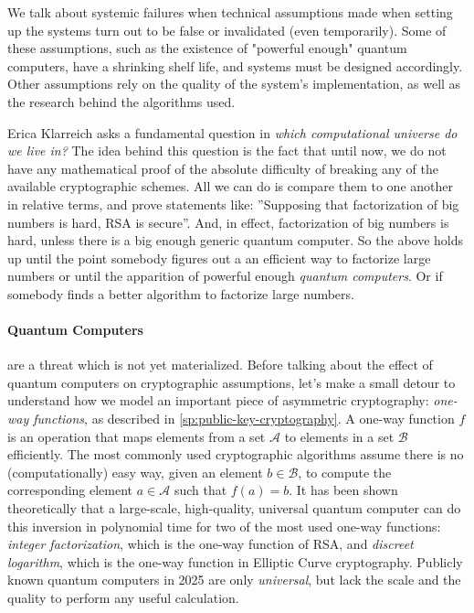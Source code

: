 We talk about systemic failures when technical assumptions made when setting up the systems turn out to be false or invalidated (even temporarily).
Some of these assumptions, such as the existence of "powerful enough" quantum computers, have a shrinking shelf life, and systems must be designed accordingly.
Other assumptions rely on the quality of the system's implementation, as well as
the research behind the algorithms used.

Erica Klarreich asks a fundamental question in \emph{which computational universe do we live in?}\cite{KlarUniverse22}
The idea behind this question is the fact that until now, we do not have any mathematical proof of the absolute difficulty
of breaking any of the available cryptographic schemes.
All we can do is compare them to one another in relative terms, and prove statements like: 
''Supposing that factorization of big numbers is hard, RSA is secure''.
And, in effect, factorization of big numbers is hard, unless there is a big enough generic quantum computer.
So the above holds up until the point somebody figures out a an efficient way to factorize large numbers or until the apparition of powerful enough \emph{quantum computers}.
Or if somebody finds a better algorithm to factorize large numbers. 

\paragraph{Quantum Computers} are a threat which is not yet materialized.
Before talking about the effect of quantum computers on cryptographic assumptions, let's make a small detour to understand how we model an important piece of asymmetric cryptography: \emph{one-way functions}, as described in
\ref{sp:public-key-cryptography}.
A one-way function $f$ is an operation that maps elements from a set $\mathcal{A}$ to elements in a set $\mathcal{B}$ efficiently. The most commonly used cryptographic algorithms assume there is no (computationally) easy way, given an element $b \in \mathcal{B}$, to compute the corresponding element $a \in \mathcal{A}$ such that $f(a) = b$.
It has been shown theoretically that a large-scale, high-quality, universal
quantum computer \cite[s. 2.1]{TaurusQuantum23} can do this inversion in polynomial time for two of the most used one-way functions: 
\emph{integer factorization}, which is the one-way function of RSA, 
and \emph{discreet logarithm}, which is the one-way function in Elliptic Curve cryptography.
Publicly known quantum computers in 2025 are only \emph{universal}, but lack
the scale and the quality to perform any useful calculation.

